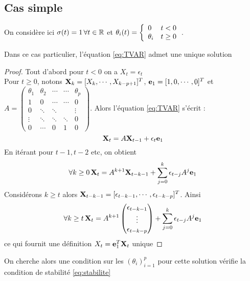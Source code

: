 \documentclass{report}
\begin{document}
\subsection{Cas simple}
On considère ici $\sigma(t)=1 \, \forall t\in \mathbb{R}$ et $\theta_i(t) = { \left\lbrace \begin{array}{ll} 
0 & t<0 \\
\theta_i & t \geq 0 \\ 
 \end{array} \right. } $. 
\begin{Prop}\label{prop:cas_simple_unicite}
Dans ce cas particulier, l'équation \eqref{eq:TVAR} admet une unique solution
\end{Prop} 
\begin{proof}
Tout d'abord pour $t < 0$ on a $X_t = \epsilon_t$ \\
Pour $t \geq 0$, notons $\mathbf{X}_k = [ X_k, \cdots , X_{k-p+1} ]^T$, $\mathbf{e}_1 = [1,0, \cdots, 0]^T$ et $A = \begin{pmatrix}
\theta_1 & \theta_2 & \cdots & \cdots & \theta_p \\
1 & 0 & \cdots & \cdots & 0 \\
0 & \ddots & \ddots & & \vdots \\
\vdots & \ddots & \ddots & \ddots & 0 \\
0 & \cdots & 0 & 1 & 0
\end{pmatrix}$. Alors l'équation \eqref{eq:TVAR} s'écrit : 
\[ \mathbf{X}_t = A\mathbf{X}_{t-1} + \epsilon_t \mathbf{e}_1 \]
En itérant pour $t-1, t-2$ etc, on obtient 
\[ \forall k\geq 0 \,  \mathbf{X}_t = A^{k+1} \mathbf{X}_{t-k-1} + \sum_{j=0}^k \epsilon_{t-j} A^j \mathbf{e}_1  \]
Considérons $k \geq t$ alors $\mathbf{X}_{t-k-1} = [ \epsilon_{t-k-1}, \cdots , \epsilon_{t-k-p} ]^T$. Ainsi 
\begin{equation}\label{eq:X}
\forall k\geq t \,  \mathbf{X}_t = A^{k+1} \begin{pmatrix}
\epsilon_{t-k-1} \\
\vdots \\
\epsilon_{t-k-p}\\
\end{pmatrix} 
+ \sum_{j=0}^k \epsilon_{t-j} A^j \mathbf{e}_1  
\end{equation}
ce qui fournit une définition $X_t = \mathbf{e}_1^T \mathbf{X}_t$ unique
\end{proof}

On cherche alors une condition sur les $(\theta_i)_{i=1}^p$ pour cette solution vérifie la condition de stabilité \eqref{eq:stabilite}
\end{document}
